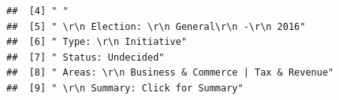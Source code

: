 \documentclass{article}\usepackage[]{graphicx}\usepackage[]{color}
\makeatletter
\newenvironment{kframe}{%
 \def\at@end@of@kframe{}%
 \ifinner\ifhmode%
  \def\at@end@of@kframe{\end{minipage}}%
  \begin{minipage}{\columnwidth}%
 \fi\fi%
 \def\FrameCommand##1{\hskip\@totalleftmargin \hskip-\fboxsep
 \colorbox{shadecolor}{##1}\hskip-\fboxsep
     \hskip-\linewidth \hskip-\@totalleftmargin \hskip\columnwidth}%
 \MakeFramed {\advance\hsize-\width
   \@totalleftmargin\z@ \linewidth\hsize
   \@setminipage}}%
 {\par\unskip\endMakeFramed%
 \at@end@of@kframe}
\newenvironment{knitrout}{}{} %
\makeatother
\begin{document}
\begin{knitrout}
\begin{kframe}
\begin{verbatim}
##  [4] " "                                                                                                                                                                                                                                                                                                                                                                                                                                                                                     
##  [5] " \r\n Election: \r\n General\r\n -\r\n 2016"                                                                                                                                                                                                                                                                                                                                                                                                                                           
##  [6] " Type: \r\n Initiative"                                                                                                                                                                                                                                                                                                                                                                                                                                                                
##  [7] " Status: Undecided"                                                                                                                                                                                                                                                                                                                                                                                                                                                                    
##  [8] " Areas: \r\n Business & Commerce | Tax & Revenue"                                                                                                                                                                                                                                                                                                                                                                                                                                      
##  [9] " \r\n Summary: Click for Summary"                                                                                                                                                                                                                                                                                                                                                                                                                                                      

\end{verbatim}
\end{kframe}
\end{knitrout}
\end{document}
